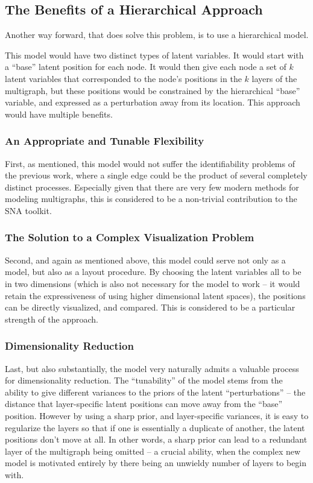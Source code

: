 \documentclass[11pt]{scrartcl}
\begin{document}
\subsection{The Benefits of a Hierarchical Approach}
Another way forward, that does solve this problem, is to use a hierarchical model.

This model would have two distinct types of latent variables. It would start with a ``base''  latent position for each node. It would then give each node a set of $k$ latent variables that corresponded to the node's positions in the $k$ layers of the multigraph, but these positions would be constrained by the hierarchical ``base'' variable, and expressed as a perturbation away from its location. This approach would have multiple benefits.

\subsubsection{An Appropriate and Tunable Flexibility}
First, as mentioned, this model would not suffer the identifiability problems of the previous work, where a single edge could be the product of several completely distinct processes. Especially given that there are very few modern methods for modeling multigraphs, this is considered to be a non-trivial contribution to the SNA toolkit.

\subsubsection{The Solution to a Complex Visualization Problem}
Second, and again as mentioned above, this model could serve not only as a model, but also as a layout procedure. By choosing the latent variables all to be in two dimensions (which is also not necessary for the model to work -- it would retain the expressiveness of using higher dimensional latent spaces), the positions can be directly visualized, and compared. This is considered to be a particular strength of the approach.

\subsubsection{Dimensionality Reduction}
Last, but also substantially, the model very naturally admits a valuable process for dimensionality reduction. The ``tunability'' of the model stems from the ability to give different variances to the priors of the latent ``perturbations'' -- the distance that layer-specific latent positions can move away from the ``base'' position. However by using a sharp prior, and layer-specific variances, it is easy to regularize the layers so that if one is essentially a duplicate of another, the latent positions don't move at all. In other words, a sharp prior can lead to a redundant layer of the multigraph being omitted -- a crucial ability, when the complex new model is motivated entirely by there being an unwieldy number of layers to begin with.
\end{document}
